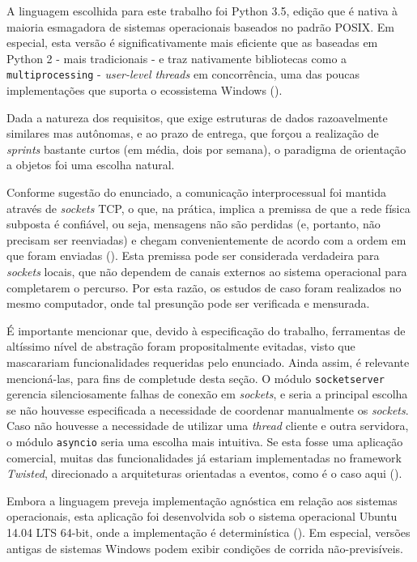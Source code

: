 \documentclass[a4paper,12pt]{article}
\begin{document}
            A linguagem escolhida para este trabalho foi Python 3.5, edição que é nativa à maioria esmagadora de sistemas operacionais baseados no padrão POSIX.
            Em especial, esta versão é significativamente mais eficiente que as baseadas em Python 2 - mais tradicionais - e traz nativamente bibliotecas como a \texttt{multiprocessing} - \emph{user-level threads} em concorrência, uma das poucas implementações que suporta o ecossistema Windows (\cite{WEBSITE:8}).
            
            Dada a natureza dos requisitos, que exige estruturas de dados razoavelmente similares mas autônomas, e ao prazo de entrega, que forçou a realização de \emph{sprints} bastante curtos (em média, dois por semana), o paradigma de orientação a objetos foi uma escolha natural.

            Conforme sugestão do enunciado, a comunicação interprocessual foi mantida através de \emph{sockets} TCP, o que, na prática, implica a premissa de que a rede física subposta é confiável, ou seja, mensagens não são perdidas (e, portanto, não precisam ser reenviadas) e chegam convenientemente de acordo com a ordem em que foram enviadas (\cite{KuroseRoss2007}).
            Esta premissa pode ser considerada verdadeira para \emph{sockets} locais, que não dependem de canais externos ao sistema operacional para completarem o percurso.
            Por esta razão, os estudos de caso foram realizados no mesmo computador, onde tal presunção pode ser verificada e mensurada.

            É importante mencionar que, devido à especificação do trabalho, ferramentas de altíssimo nível de abstração foram propositalmente evitadas, visto que mascarariam funcionalidades requeridas pelo enunciado.
            Ainda assim, é relevante mencioná-las, para fins de completude desta seção.
            O módulo \texttt{socketserver} gerencia silenciosamente falhas de conexão em \emph{sockets}, e seria a principal escolha se não houvesse especificada a necessidade de coordenar manualmente os \emph{sockets}.
            Caso não houvesse a necessidade de utilizar uma \emph{thread} cliente e outra servidora, o módulo \texttt{asyncio} seria uma escolha mais intuitiva.
            Se esta fosse uma aplicação comercial, muitas das funcionalidades já estariam implementadas no framework \emph{Twisted}, direcionado a arquiteturas orientadas a eventos, como é o caso aqui (\cite{WEBSITE:11}).

            Embora a linguagem preveja implementação agnóstica em relação aos sistemas operacionais, esta aplicação foi desenvolvida sob o sistema operacional Ubuntu 14.04 LTS 64-bit, onde a implementação é determinística (\cite{WEBSITE:8}).
            Em especial, versões antigas de sistemas Windows podem exibir condições de corrida não-previsíveis.
\end{document}
